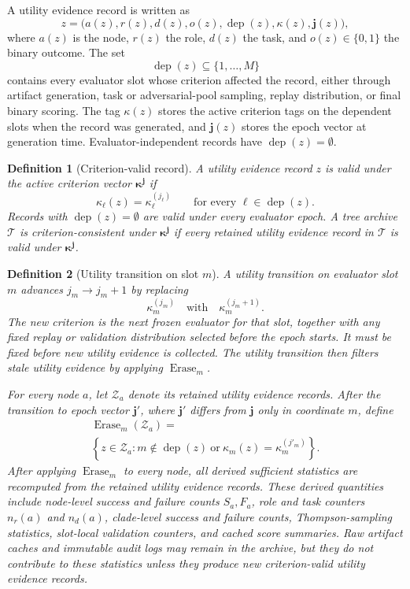 \documentclass{paper}
\newtheorem{definition}{Definition}[section]
\begin{document}
A utility evidence record is written as
\[
z
=
\bigl(a(z),r(z),d(z),o(z),\operatorname{dep}(z),\kappa(z),\boldsymbol{j}(z)\bigr),
\]
where \(a(z)\) is the node, \(r(z)\) the role, \(d(z)\) the task, and \(o(z)\in\{0,1\}\) the binary
outcome. The set
\[
\operatorname{dep}(z)\subseteq\{1,\ldots,M\}
\]
contains every evaluator slot whose criterion affected the record, either through artifact generation,
task or adversarial-pool sampling, replay distribution, or final binary scoring. The tag \(\kappa(z)\) stores
the active criterion tags on the dependent slots when the record was generated, and \(\boldsymbol{j}(z)\)
stores the epoch vector at generation time. Evaluator-independent records have
\(\operatorname{dep}(z)=\emptyset\).

\begin{definition}[Criterion-valid record]
\label{def:criterion-valid-record}
A utility evidence record \(z\) is valid under the active criterion vector
\(\boldsymbol{\kappa}^{\boldsymbol{j}}\) if
\[
\kappa_\ell(z)=\kappa_\ell^{(j_\ell)}
\qquad
\text{for every } \ell\in\operatorname{dep}(z).
\]
Records with \(\operatorname{dep}(z)=\emptyset\) are valid under every evaluator epoch.
A tree archive \(\mathcal T\) is criterion-consistent under
\(\boldsymbol{\kappa}^{\boldsymbol{j}}\) if every retained utility evidence record in
\(\mathcal T\) is valid under \(\boldsymbol{\kappa}^{\boldsymbol{j}}\).
\end{definition}

\begin{definition}[Utility transition on slot \(m\)]
\label{def:utility-transition}
A utility transition on evaluator slot \(m\) advances \(j_m\to j_m+1\) by replacing
\[
\kappa_m^{(j_m)}
\quad\text{with}\quad
\kappa_m^{(j_m+1)}.
\]
The new criterion is the next frozen evaluator for that slot, together with any fixed replay or
validation distribution selected before the epoch starts. It must be fixed before new utility evidence
is collected. The utility transition then filters stale utility evidence by applying
\(\operatorname{Erase}_m\).

For every node \(a\), let \(\mathcal Z_a\) denote its retained utility evidence records. After the
transition to epoch vector \(\boldsymbol{j}'\), where \(\boldsymbol{j}'\) differs from \(\boldsymbol{j}\) only in
coordinate \(m\), define
\[
\begin{gathered}
\operatorname{Erase}_m(\mathcal Z_a)
=\\
\left\{
z\in\mathcal Z_a:
m\notin\operatorname{dep}(z)
\ \text{or}\
\kappa_m(z)=\kappa_m^{(j'_m)}
\right\}.
\end{gathered}
\]
After applying \(\operatorname{Erase}_m\) to every node, all derived sufficient statistics are recomputed
from the retained utility evidence records. These derived quantities include node-level success and
failure counts \(S_a,F_a\), role and task counters \(n_r(a)\) and \(n_d(a)\), clade-level success
and failure counts, Thompson-sampling statistics, slot-local validation counters, and cached score
summaries. Raw artifact caches and immutable audit logs may remain in the archive, but they do not
contribute to these statistics unless they produce new criterion-valid utility evidence records.
\end{definition}
\end{document}
